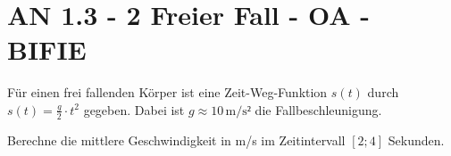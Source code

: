 \section{AN 1.3 - 2 Freier Fall - OA - BIFIE}


\begin{beispiel}[AN 1.3]{1} %
Für einen frei fallenden Körper ist eine Zeit-Weg-Funktion $s(t)$ durch $s(t) = \frac{g}{2} \cdot t^2$ gegeben. Dabei ist $g \approx 10\,\text{m/s}²$ die Fallbeschleunigung. 

\leer

Berechne die mittlere Geschwindigkeit in m/s im Zeitintervall $[2;4]$ Sekunden.

\end{beispiel}
